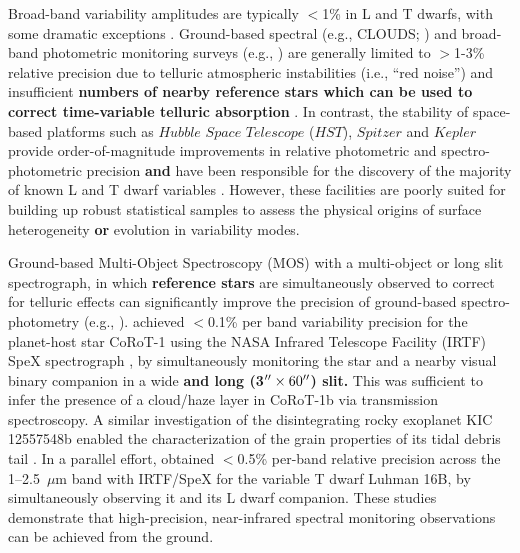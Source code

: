 \documentclass[twocolumn]{aastex6}
\begin{document}
Broad-band variability amplitudes are typically $<$1\% in L and T dwarfs, with some dramatic exceptions \citep{2009ApJ...701.1534A,2012ApJ...750..105R,2013A&A...555L...5G,2016ApJ...829L..32L}. 
Ground-based spectral (e.g., CLOUDS; \citealt{2008A&A...487..277G}) and broad-band photometric monitoring surveys (e.g., \citealt{1999A&A...348..800B,2003MNRAS.346..473K,2014ApJ...793...75R,2014A&A...566A.111W}) are generally limited to $>$1-3\% relative precision due to telluric atmospheric instabilities (i.e., ``red noise'') and insufficient \textbf{numbers of nearby reference stars which can be used to correct time-variable telluric absorption} \citep{2003MNRAS.339..477B}.
In contrast, the stability of space-based platforms such as $Hubble$ $Space$ $Telescope$ ($HST$), $Spitzer$ and $Kepler$ provide order-of-magnitude improvements in relative photometric and spectro-photometric precision \textbf{and} have been responsible for the discovery of the majority of known L and T dwarf variables \citep{2013ApJ...768..121A,2013ApJ...779..172G,2015ApJ...799..154M}. However, these facilities are poorly suited for building up robust statistical samples to assess the physical origins of surface heterogeneity \textbf{or} evolution in variability modes. 

Ground-based Multi-Object Spectroscopy (MOS) with a multi-object or long slit spectrograph, in which \textbf{reference stars} are simultaneously observed to correct for telluric effects can significantly improve the precision of ground-based spectro-photometry (e.g., \citealt{bean10,bean2013,gibson13clouds,stevenson2016hatp26}). \citet{2014ApJ...783....5S} achieved $<$0.1\% per band variability precision for the planet-host star CoRoT-1 using the NASA Infrared Telescope Facility (IRTF) SpeX spectrograph \citep{2003PASP..115..362R}, by simultaneously monitoring the star and a nearby visual binary companion in a wide \textbf{and long (3$\mbox{$^{\prime\prime}$} \times 60 \mbox{$^{\prime\prime}$}$) slit.} This was sufficient to infer the presence of a cloud/haze layer in CoRoT-1b via transmission spectroscopy. A similar investigation of the disintegrating rocky exoplanet KIC 12557548b  enabled the characterization of the grain properties of its tidal debris tail \citep{2016ApJ...826..156S}. In a parallel effort, \citet{2014ApJ...785...48B} obtained $<$0.5\% per-band relative precision across the 1--2.5~$\mu$m band with IRTF/SpeX for the variable T dwarf Luhman 16B, by simultaneously observing it and its L dwarf companion. These studies demonstrate that high-precision, near-infrared spectral monitoring observations can be achieved from the ground.
\end{document}
